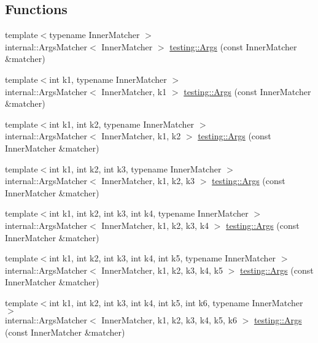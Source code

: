 \subsection*{Functions}
\begin{DoxyCompactItemize}
\item 
{\footnotesize template$<$typename Inner\+Matcher $>$ }\\internal\+::\+Args\+Matcher$<$ Inner\+Matcher $>$ \mbox{\hyperlink{namespacetesting_aaca153f67b689b8b9d5b8c67ecf8cee4}{testing\+::\+Args}} (const Inner\+Matcher \&matcher)
\item 
{\footnotesize template$<$int k1, typename Inner\+Matcher $>$ }\\internal\+::\+Args\+Matcher$<$ Inner\+Matcher, k1 $>$ \mbox{\hyperlink{namespacetesting_af67bac6da407df7586f60cfa2c9b602d}{testing\+::\+Args}} (const Inner\+Matcher \&matcher)
\item 
{\footnotesize template$<$int k1, int k2, typename Inner\+Matcher $>$ }\\internal\+::\+Args\+Matcher$<$ Inner\+Matcher, k1, k2 $>$ \mbox{\hyperlink{namespacetesting_a663409e441584c81f496e9c98fd3453c}{testing\+::\+Args}} (const Inner\+Matcher \&matcher)
\item 
{\footnotesize template$<$int k1, int k2, int k3, typename Inner\+Matcher $>$ }\\internal\+::\+Args\+Matcher$<$ Inner\+Matcher, k1, k2, k3 $>$ \mbox{\hyperlink{namespacetesting_abd3ddae153e1c452b7625808cc4d820b}{testing\+::\+Args}} (const Inner\+Matcher \&matcher)
\item 
{\footnotesize template$<$int k1, int k2, int k3, int k4, typename Inner\+Matcher $>$ }\\internal\+::\+Args\+Matcher$<$ Inner\+Matcher, k1, k2, k3, k4 $>$ \mbox{\hyperlink{namespacetesting_aeff7e644fd00516c3519fe8c0dc1aee2}{testing\+::\+Args}} (const Inner\+Matcher \&matcher)
\item 
{\footnotesize template$<$int k1, int k2, int k3, int k4, int k5, typename Inner\+Matcher $>$ }\\internal\+::\+Args\+Matcher$<$ Inner\+Matcher, k1, k2, k3, k4, k5 $>$ \mbox{\hyperlink{namespacetesting_aede9fd33cce0d21f5e31ba10a0706827}{testing\+::\+Args}} (const Inner\+Matcher \&matcher)
\item 
{\footnotesize template$<$int k1, int k2, int k3, int k4, int k5, int k6, typename Inner\+Matcher $>$ }\\internal\+::\+Args\+Matcher$<$ Inner\+Matcher, k1, k2, k3, k4, k5, k6 $>$ \mbox{\hyperlink{namespacetesting_abc92e87b4a9cad372b082d81479f3d48}{testing\+::\+Args}} (const Inner\+Matcher \&matcher)

\end{DoxyCompactItemize}
